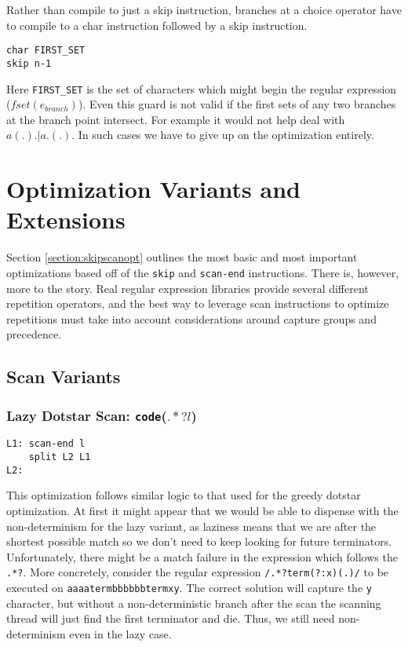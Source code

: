 Rather than compile to just a skip instruction, branches
at a choice operator have to compile to a char instruction
followed by a skip instruction.

\begin{verbatim}
char FIRST_SET
skip n-1
\end{verbatim}

Here \verb'FIRST_SET' is the set of characters which might
begin the regular expression ($fset(e_{branch})$).
Even this guard is not valid if the first sets of any two
branches at the branch point intersect. For example it would
not help deal with $a(.).|a.(.)$. In such cases we have to 
give up on the optimization entirely.

\section{Optimization Variants and Extensions}
\label{section:optextend}

Section \ref{section:skipscanopt} outlines the most basic and most
important optimizations based off of the \verb'skip' and \verb'scan-end'
instructions. There is, however, more to the story.
Real regular expression libraries provide several different repetition
operators, and the best way to leverage scan instructions to optimize
repetitions must take into account considerations around capture groups and
precedence.


\subsection{Scan Variants}

\subsubsection{Lazy Dotstar Scan: {\tt code}($.*?l$)}

\begin{verbatim}
L1: scan-end l
    split L2 L1
L2: 
\end{verbatim}

This optimization follows similar logic to that used for the greedy
dotstar optimization. At first it might appear that we would be able
to dispense with the non-determinism for the lazy variant, as laziness
means that we are after the shortest possible match so we don't
need to keep looking for future terminators. Unfortunately, there
might be a match failure in the expression which follows the
\verb'.*?'. More concretely, consider the regular expression
\verb'/.*?term(?:x)(.)/'
to be executed on \verb'aaaatermbbbbbbtermxy'. The correct solution will
capture the \verb'y' character, but without a non-deterministic branch
after the scan the scanning thread will just find the first terminator and
die. Thus, we still need non-determinism even in the lazy case.

